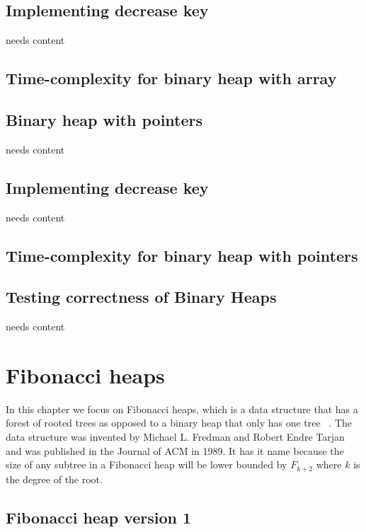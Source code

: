 \documentclass[12pt,a4paper,twoside,danish,article]{article}
\begin{document}
\section{Implementing decrease key}

needs content

\section{Time-complexity for binary heap with array}

\section{Binary heap with pointers}

needs content

\section{Implementing decrease key}

needs content

\section{Time-complexity for binary heap with pointers}

\section{Testing correctness of Binary Heaps}

needs content

\chapter{Fibonacci heaps}

In this chapter we focus on Fibonacci heaps, which is a data structure that has a forest of rooted trees as opposed to a binary heap that only has one tree ~\cite{FT87}. The data structure was invented by Michael L. Fredman and Robert Endre Tarjan and was published in the Journal of ACM in 1989. It has it name because the size of any subtree in a Fibonacci heap will be lower bounded by $F_{k+2}$ where $k$ is the degree of the root.

\section{Fibonacci heap version 1}
\end{document}
